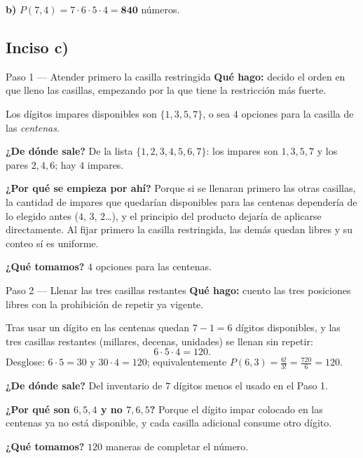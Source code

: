 \documentclass[11pt]{article}
\begin{document}
\begin{resp}
\textbf{b)} $P(7,4) = 7\cdot 6\cdot 5\cdot 4 = \mathbf{840}$ números.
\end{resp}

\subsection*{Inciso c)}

\begin{paso}{Paso 1 --- Atender primero la casilla restringida}
\textbf{Qué hago:} decido el orden en que lleno las casillas, empezando por la que tiene la restricción más fuerte.

Los dígitos impares disponibles son $\{1,3,5,7\}$, o sea $4$ opciones para la casilla de las \emph{centenas}.

\textbf{¿De dónde sale?} De la lista $\{1,2,3,4,5,6,7\}$: los impares son $1,3,5,7$ y los pares $2,4,6$; hay $4$ impares.

\textbf{¿Por qué se empieza por ahí?} Porque si se llenaran primero las otras casillas, la cantidad de impares que quedarían disponibles para las centenas dependería de lo elegido antes ($4$, $3$, $2$\dots), y el principio del producto dejaría de aplicarse directamente. Al fijar primero la casilla restringida, las demás quedan libres y su conteo sí es uniforme.

\textbf{¿Qué tomamos?} $4$ opciones para las centenas.
\end{paso}

\begin{paso}{Paso 2 --- Llenar las tres casillas restantes}
\textbf{Qué hago:} cuento las tres posiciones libres con la prohibición de repetir ya vigente.

Tras usar un dígito en las centenas quedan $7-1=6$ dígitos disponibles, y las tres casillas restantes (millares, decenas, unidades) se llenan sin repetir:
\[
6\cdot 5\cdot 4 = 120 .
\]
Desglose: $6\cdot 5 = 30$ y $30\cdot 4 = 120$; equivalentemente $P(6,3)=\frac{6!}{3!}=\frac{720}{6}=120$.

\textbf{¿De dónde sale?} Del inventario de $7$ dígitos menos el usado en el Paso 1.

\textbf{¿Por qué son $6,5,4$ y no $7,6,5$?} Porque el dígito impar colocado en las centenas ya no está disponible, y cada casilla adicional consume otro dígito.

\textbf{¿Qué tomamos?} $120$ maneras de completar el número.
\end{paso}
\end{document}
